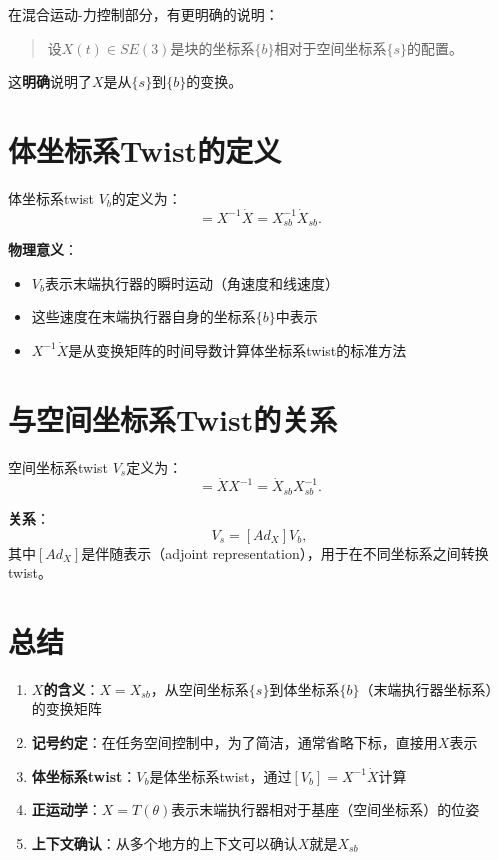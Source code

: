 \documentclass{article}
\begin{document}
在混合运动-力控制部分，有更明确的说明：
\begin{quote}
设$X(t) \in SE(3)$是块的坐标系$\{b\}$相对于空间坐标系$\{s\}$的配置。
\end{quote}

这\textbf{明确}说明了$X$是从$\{s\}$到$\{b\}$的变换。

\section{体坐标系Twist的定义}

体坐标系twist $V_b$的定义为：
\begin{equation}
[V_b] = X^{-1}\dot{X} = X_{sb}^{-1}\dot{X}_{sb}.
\end{equation}

\textbf{物理意义}：
\begin{itemize}
\item $V_b$表示末端执行器的瞬时运动（角速度和线速度）
\item 这些速度在末端执行器自身的坐标系$\{b\}$中表示
\item $X^{-1}\dot{X}$是从变换矩阵的时间导数计算体坐标系twist的标准方法
\end{itemize}

\section{与空间坐标系Twist的关系}

空间坐标系twist $V_s$定义为：
\begin{equation}
[V_s] = \dot{X}X^{-1} = \dot{X}_{sb}X_{sb}^{-1}.
\end{equation}

\textbf{关系}：
\begin{equation}
V_s = [Ad_X]V_b,
\end{equation}
其中$[Ad_X]$是伴随表示（adjoint representation），用于在不同坐标系之间转换twist。

\section{总结}

\begin{enumerate}
\item \textbf{$X$的含义}：$X = X_{sb}$，从空间坐标系$\{s\}$到体坐标系$\{b\}$（末端执行器坐标系）的变换矩阵

\item \textbf{记号约定}：在任务空间控制中，为了简洁，通常省略下标，直接用$X$表示

\item \textbf{体坐标系twist}：$V_b$是体坐标系twist，通过$[V_b] = X^{-1}\dot{X}$计算

\item \textbf{正运动学}：$X = T(\theta)$表示末端执行器相对于基座（空间坐标系）的位姿

\item \textbf{上下文确认}：从多个地方的上下文可以确认$X$就是$X_{sb}$
\end{enumerate}
\end{document}
